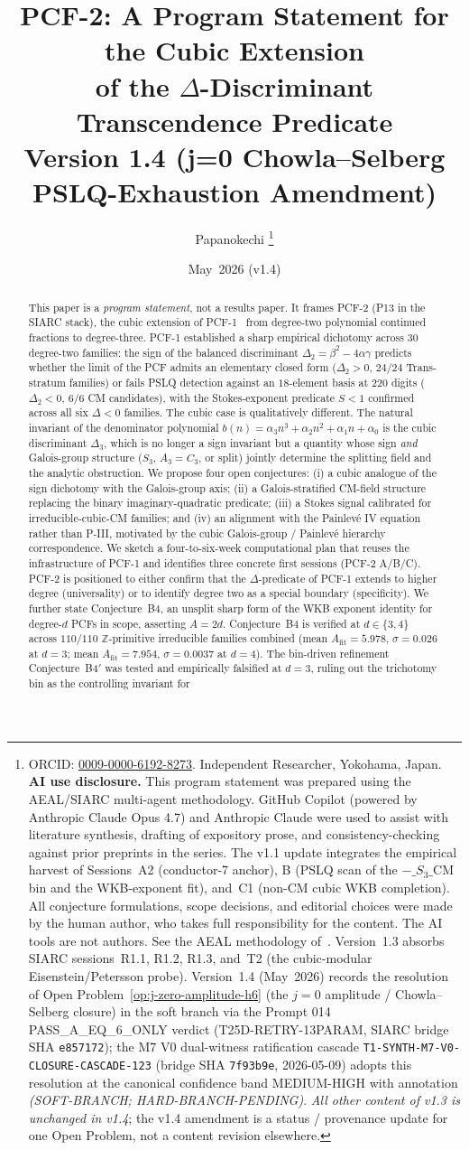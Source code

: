 \documentclass[11pt,a4paper]{article}
\title{PCF-2: A Program Statement for the Cubic Extension\\
       of the $\Delta$-Discriminant Transcendence Predicate\\
       \large Version 1.4 (j=0 Chowla--Selberg PSLQ-Exhaustion Amendment)}
\author{Papanokechi%
\thanks{ORCID: \href{https://orcid.org/0009-0000-6192-8273}{0009-0000-6192-8273}.
Independent Researcher, Yokohama, Japan.
\textbf{AI use disclosure.} This program statement was prepared using the
AEAL/SIARC multi-agent methodology. GitHub Copilot (powered by Anthropic
Claude Opus 4.7) and Anthropic Claude were used to assist with literature
synthesis, drafting of expository prose, and consistency-checking against
prior preprints in the series. The v1.1 update integrates the empirical
harvest of Sessions~A2 (conductor-7 anchor), B (PSLQ scan of the
$-\_S_3\_\mathrm{CM}$ bin and the WKB-exponent fit), and~C1 (non-CM cubic
WKB completion). All conjecture formulations, scope decisions, and
editorial choices were made by the human author, who takes full
responsibility for the content. The AI tools are not authors. See the
AEAL methodology of~\cite{P8AEAL}. Version~1.3 absorbs SIARC sessions~R1.1, R1.2, R1.3, and~T2 (the cubic-modular Eisenstein/Petersson probe).
Version~1.4 (May~2026) records the resolution of Open Problem~\ref{op:j-zero-amplitude-h6} (the $j=0$ amplitude / Chowla--Selberg closure)
in the soft branch via the Prompt 014 \textsf{PASS\_A\_EQ\_6\_ONLY} verdict (T25D-RETRY-13PARAM,
SIARC bridge SHA \texttt{e857172}); the M7 V0 dual-witness ratification cascade
\texttt{T1-SYNTH-M7-V0-CLOSURE-CASCADE-123} (bridge SHA \texttt{7f93b9e}, 2026-05-09)
adopts this resolution at the canonical confidence band MEDIUM-HIGH with annotation
\emph{(SOFT-BRANCH; HARD-BRANCH-PENDING)}. \emph{All other content of v1.3 is unchanged
in v1.4}; the v1.4 amendment is a status / provenance update for one Open Problem,
not a content revision elsewhere.}}
\date{May~2026 (v1.4)}
\theoremstyle{definition}
\theoremstyle{remark}
\newcommand{\Z}{\mathbb{Z}}
\begin{document}
\maketitle

\begin{abstract}
This paper is a \emph{program statement}, not a results paper. It frames
PCF-2 (P13 in the SIARC stack), the cubic extension of
PCF-1~\cite{Papanokechi2026PCF1} from degree-two polynomial continued
fractions to degree-three. PCF-1 established a sharp empirical dichotomy
across $30$ degree-two families: the sign of the balanced discriminant
$\Delta_{2}=\beta^{2}-4\alpha\gamma$ predicts whether the limit of the
PCF admits an elementary closed form ($\Delta_{2}>0$, $24/24$ Trans-stratum
families) or fails PSLQ detection against an $18$-element basis at $220$
digits ($\Delta_{2}<0$, $6/6$ CM candidates), with the Stokes-exponent
predicate $S<1$ confirmed across all six $\Delta<0$ families. The cubic
case is qualitatively different. The natural invariant of the denominator
polynomial $b(n)=\alpha_{3}n^{3}+\alpha_{2}n^{2}+\alpha_{1}n+\alpha_{0}$ is
the cubic discriminant $\Delta_{3}$, which is no longer a sign invariant
but a quantity whose sign \emph{and} Galois-group structure
($S_{3}$, $A_{3}=C_{3}$, or split) jointly determine the splitting field
and the analytic obstruction. We propose four open conjectures:
(i) a cubic analogue of the sign dichotomy with the Galois-group axis;
(ii) a Galois-stratified CM-field structure replacing the binary
imaginary-quadratic predicate;
(iii) a Stokes signal calibrated for irreducible-cubic-CM families;
and (iv) an alignment with the Painlev\'e IV equation rather than P-III,
motivated by the cubic Galois-group / Painlev\'e hierarchy correspondence.
We sketch a four-to-six-week computational plan that reuses the
infrastructure of PCF-1 and identifies three concrete first sessions
(PCF-2 A/B/C). PCF-2 is positioned to either confirm that the
$\Delta$-predicate of PCF-1 extends to higher degree (universality) or to
identify degree two as a special boundary (specificity).
We further state Conjecture~B4, an unsplit sharp form of the WKB
exponent identity for degree-$d$ PCFs in scope, asserting $A=2d$.
Conjecture~B4 is verified at $d\in\{3,4\}$ across $110/110$
$\Z$-primitive irreducible families combined (mean
$A_{\mathrm{fit}}=5.978$, $\sigma=0.026$ at $d=3$; mean
$A_{\mathrm{fit}}=7.954$, $\sigma=0.0037$ at $d=4$). The bin-driven
refinement Conjecture~B4$'$ was tested and empirically falsified at
$d=3$, ruling out the trichotomy bin as the controlling invariant for

\end{abstract}
\end{document}
